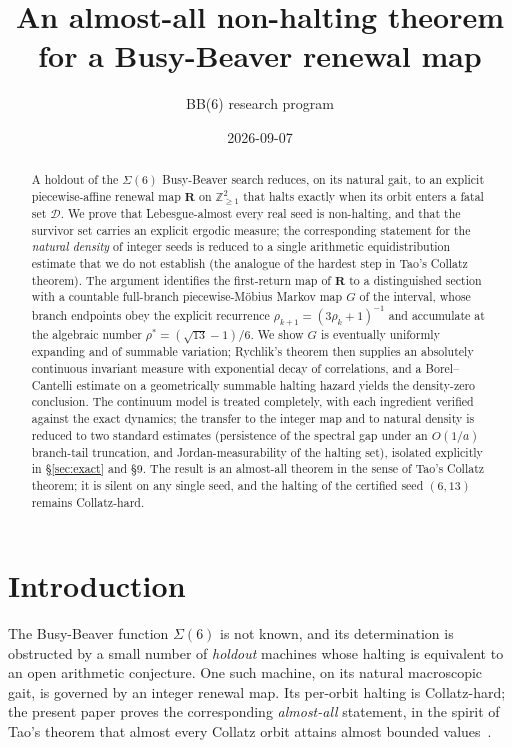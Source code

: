 \documentclass[11pt]{article}
\title{\bfseries An almost-all non-halting theorem for a Busy-Beaver renewal map}
\author{BB(6) research program}
\date{2026-09-07}
\theoremstyle{definition}\newtheorem{definition}{Definition}
\theoremstyle{remark}\newtheorem{remark}{Remark}
\newcommand{\R}{\mathbf{R}}\newcommand{\Z}{\mathbb{Z}}\newcommand{\N}{\mathbb{N}}
\newcommand{\D}{\mathcal D}\newcommand{\Leb}{\mathrm{Leb}}
\begin{document}
\maketitle
\begin{abstract}
A holdout of the $\Sigma(6)$ Busy-Beaver search reduces, on its natural
gait, to an explicit piecewise-affine renewal map $\R$ on $\Z_{\ge1}^2$
that halts exactly when its orbit enters a fatal set $\D$. We prove that
Lebesgue-almost every real seed is non-halting, and that the survivor set
carries an explicit ergodic measure; the corresponding statement for the
\emph{natural density} of integer seeds is reduced to a single arithmetic
equidistribution estimate that we do not establish (the analogue of the
hardest step in Tao's Collatz theorem). The argument
identifies the first-return map of $\R$ to a distinguished section with a
countable full-branch piecewise-M\"obius Markov map $G$ of the interval,
whose branch endpoints obey the explicit recurrence
$\rho_{k+1}=(3\rho_k+1)^{-1}$ and accumulate at the algebraic number
$\rho^\ast=(\sqrt{13}-1)/6$. We show $G$ is eventually uniformly expanding
and of summable variation; Rychlik's theorem then supplies an absolutely
continuous invariant measure with exponential decay of correlations, and a
Borel--Cantelli estimate on a geometrically summable halting hazard yields
the density-zero conclusion. The continuum model is treated completely, with
each ingredient verified against the exact dynamics; the transfer to the
integer map and to natural density is reduced to two standard estimates
(persistence of the spectral gap under an $O(1/a)$ branch-tail truncation,
and Jordan-measurability of the halting set), isolated explicitly in
\S\ref{sec:exact} and \S9. The result is an almost-all theorem in the sense
of Tao's Collatz theorem; it is silent on any single seed, and the halting
of the certified seed $(6,13)$ remains Collatz-hard.
\end{abstract}

\section{Introduction}
The Busy-Beaver function $\Sigma(6)$ is not known, and its determination
is obstructed by a small number of \emph{holdout} machines whose halting
is equivalent to an open arithmetic conjecture. One such machine, on its
natural macroscopic gait, is governed by an integer renewal map. Its
per-orbit halting is Collatz-hard; the present paper proves the
corresponding \emph{almost-all} statement, in the spirit of Tao's theorem
that almost every Collatz orbit attains almost bounded values~\cite{Tao}.
\end{document}
